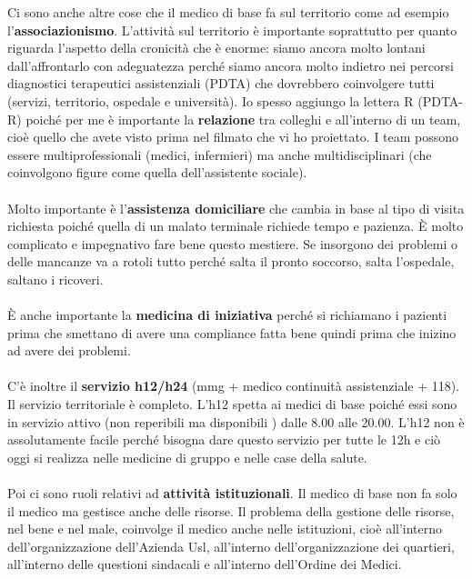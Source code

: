 Ci sono anche altre cose che il medico di base fa sul territorio come ad
esempio l'\textbf{associazionismo}. L'attività sul territorio è
importante soprattutto per quanto riguarda l'aspetto della cronicità che
è enorme: siamo ancora molto lontani dall'affrontarlo con adeguatezza
perché siamo ancora molto indietro nei percorsi diagnostici terapeutici
assistenziali (PDTA) che dovrebbero coinvolgere tutti (servizi,
territorio, ospedale e università). Io spesso aggiungo la lettera R
(PDTA-R) poiché per me è importante la \textbf{relazione} tra colleghi e
all'interno di un team, cioè quello che avete visto prima nel filmato
che vi ho proiettato. I team possono essere multiprofessionali (medici,
infermieri) ma anche multidisciplinari (che coinvolgono figure come
quella dell'assistente sociale).
\\\\
Molto importante è l'\textbf{assistenza domiciliare} che cambia in base
al tipo di visita richiesta poiché quella di un malato terminale
richiede tempo e pazienza. È molto complicato e impegnativo fare bene
questo mestiere. Se insorgono dei problemi o delle mancanze va a rotoli
tutto perché salta il pronto soccorso, salta l'ospedale, saltano i
ricoveri.
\\\\
È anche importante la \textbf{medicina di iniziativa} perché si
richiamano i pazienti prima che smettano di avere una compliance fatta
bene quindi prima che inizino ad avere dei problemi.
\\\\
C'è inoltre il \textbf{servizio h12/h24} (mmg + medico continuità
assistenziale + 118). Il servizio territoriale è completo. L'h12 spetta
ai medici di base poiché essi sono in servizio attivo (non reperibili ma
disponibili ) dalle 8.00 alle 20.00. L'h12 non è assolutamente facile
perché bisogna dare questo servizio per tutte le 12h e ciò oggi si
realizza nelle medicine di gruppo e nelle case della salute.
\\\\
Poi ci sono ruoli relativi ad \textbf{attività istituzionali}. Il medico
di base non fa solo il medico ma gestisce anche delle risorse. Il
problema della gestione delle risorse, nel bene e nel male, coinvolge il
medico anche nelle istituzioni, cioè all'interno dell'organizzazione
dell'Azienda Usl, all'interno dell'organizzazione dei quartieri,
all'interno delle questioni sindacali e all'interno dell'Ordine dei
Medici.
\\\\
